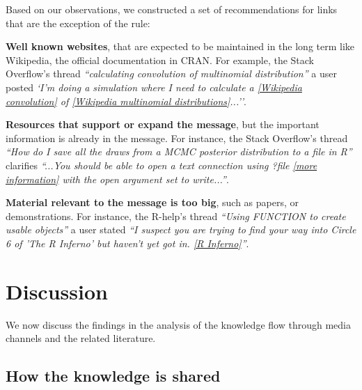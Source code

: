 \documentclass{sig-alternate-05-2015}
\begin{document}
	Based on our observations, we constructed a set of recommendations for links that are the exception of the rule:

	\begin{description}
		\item \textbf{Well known websites}, that are expected to be maintained in the long term like Wikipedia, the official documentation in CRAN.
		For example, the Stack Overflow's thread \textit{``calculating convolution of multinomial distribution''} a user posted \textit{`I'm doing a simulation where I need to calculate a \href{https://en.wikipedia.org/wiki/Convolution_of_probability_distributions}{[Wikipedia convolution]} of \href{https://en.wikipedia.org/wiki/Multinomial_distribution}{[Wikipedia multinomial distributions]}...''}.

		\item \textbf{Resources that support or expand the message}, but the important information is already in the message.
		For instance, the Stack Overflow's thread \textit{``How do I save all the draws from a MCMC posterior distribution to a file in R''} clarifies \textit{``...You should be able to open a text connection using ?file \href{http://stat.ethz.ch/R-manual/R-devel/library/base/html/connections.html}{[more information]} with the open argument set to write...''}.

		\item \textbf{Material relevant to the message is too big}, such as papers, or demonstrations.
		For instance, the R-help's thread \textit{``Using FUNCTION to create usable objects''} a user stated \textit{``I suspect you are trying to find your way into Circle 6 of 'The R Inferno' but haven't yet got in. \href{http://www.burns-stat.com/pages/Tutor/R\_inferno.pdf}{[R Inferno]}''}.
	\end{description}


\section{Discussion}
\label{cha:discussion}

	We now discuss the findings in the analysis of the knowledge flow through media channels and the related literature. 

\subsection{How the knowledge is shared}
\end{document}
